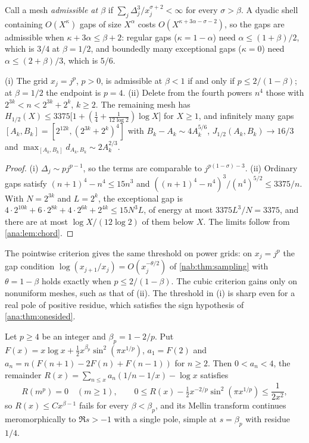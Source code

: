 Call a mesh \emph{admissible at $\beta$} if $\sum_j\Delta_j^3/x_j^{\sigma+2}<\infty$ for every
$\sigma>\beta$. A dyadic shell containing $O(X^\kappa)$ gaps of size $X^\alpha$ costs
$O(X^{\kappa+3\alpha-\sigma-2})$, so the gaps are admissible when $\kappa+3\alpha\le\beta+2$:
regular gaps ($\kappa=1-\alpha$) need $\alpha\le(1+\beta)/2$, which is $3/4$ at $\beta=1/2$, and
boundedly many exceptional gaps ($\kappa=0$) need $\alpha\le(2+\beta)/3$, which is $5/6$.

\begin{proposition}\label{ana:prop:grids}
(i) The grid $x_j=j^p$, $p>0$, is admissible at $\beta<1$ if and only if $p\le2/(1-\beta)$;
at $\beta=1/2$ the endpoint is $p=4$.
(ii) Delete from the fourth powers $n^4$ those with $2^{3k}<n<2^{3k}+2^k$, $k\ge2$. The
remaining mesh has $H_{1/2}(X)\le3375\bigl[1+(\frac14+\frac1{12\log2})\log X\bigr]$ for
$X\ge1$, and infinitely many gaps $[A_k,B_k]=[2^{12k},(2^{3k}+2^k)^4]$ with
$B_k-A_k\sim4A_k^{5/6}$, $J_{1/2}(A_k,B_k)\to16/3$ and
$\max_{[A_k,B_k]}d_{A_k,B_k}\sim2A_k^{2/3}$.
\end{proposition}

\begin{proof}
(i) $\Delta_j\sim pj^{p-1}$, so the terms are comparable to $j^{p(1-\sigma)-3}$. (ii) Ordinary
gaps satisfy $(n+1)^4-n^4\le15n^3$ and $((n+1)^4-n^4)^3/(n^4)^{5/2}\le3375/n$. With $N=2^{3k}$
and $L=2^k$, the exceptional gap is $4\cdot2^{10k}+6\cdot2^{8k}+4\cdot2^{6k}+2^{4k}\le15N^3L$,
of energy at most $3375L^3/N=3375$, and there are at most $\log X/(12\log2)$ of them below $X$.
The limits follow from \cref{ana:lem:chord}.
\end{proof}

The pointwise criterion gives the same threshold on power grids: on $x_j=j^p$ the gap condition
$\log(x_{j+1}/x_j)=O(x_j^{-\theta/2})$ of \cref{nab:thm:sampling} with $\theta=1-\beta$ holds
exactly when $p\le2/(1-\beta)$. The cubic criterion gains only on nonuniform meshes, such as that
of (ii). The threshold in (i) is sharp even for a real pole of positive residue, which satisfies the
sign hypothesis of \cref{ana:thm:onesided}.

\begin{proposition}\label{ana:prop:invisible}
Let $p\ge4$ be an integer and $\beta_p=1-2/p$. Put $F(x)=x\log x+\frac12x^{\beta_p}\sin^2(\pi x^{1/p})$,
$a_1=F(2)$ and $a_n=n(F(n+1)-2F(n)+F(n-1))$ for $n\ge2$. Then $0<a_n<4$, the remainder
$R(x)=\sum_{n\le x}a_n(1/n-1/x)-\log x$ satisfies
\[
 R(m^p)=0\quad(m\ge1),\qquad 0\le R(x)-\tfrac12x^{-2/p}\sin^2(\pi x^{1/p})\le\frac1{2x^2},
\]
so $R(x)\le Cx^{\beta-1}$ fails for every $\beta<\beta_p$, and its Mellin transform continues
meromorphically to $\Re s>-1$ with a single pole, simple at $s=\beta_p$ with residue $1/4$.
\end{proposition}

